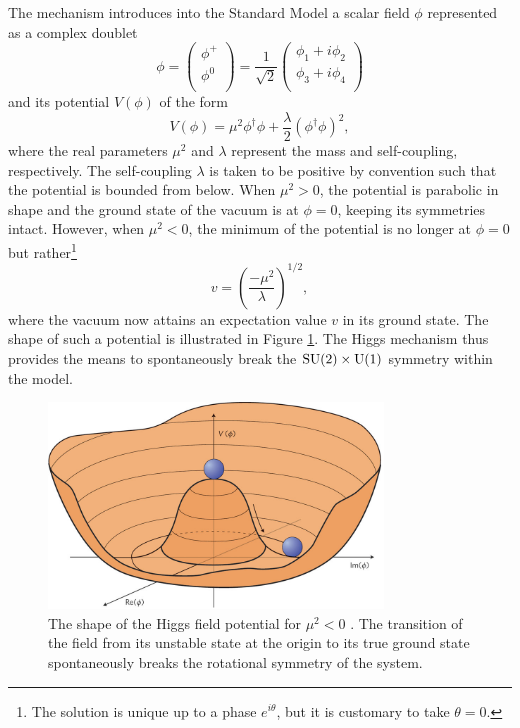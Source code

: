 The mechanism introduces into the Standard Model a scalar field $\phi$ represented as a complex doublet
\begin{equation}
  \phi = \begin{pmatrix}
           \phi^{+} \\
           \phi^{0} \\
         \end{pmatrix}
       = \frac{1}{\sqrt{2}}
         \begin{pmatrix}
           \phi_{1} + i\phi_{2} \\
           \phi_{3} + i\phi_{4} \\
         \end{pmatrix}
\end{equation}
and its potential $V(\phi)$ of the form
\begin{equation}
V(\phi) = \mu^{2}\phi^{\dag}\phi + \frac{\lambda}{2}(\phi^{\dag}\phi)^{2},
\end{equation}
where the real parameters $\mu^{2}$ and $\lambda$ represent the mass and self-coupling, respectively. The self-coupling $\lambda$ is taken to be positive by convention such that the potential is bounded from below. When $\mu^{2} > 0$, the potential is parabolic in shape and the ground state of the vacuum is at $\phi = 0$, keeping its symmetries intact. However, when $\mu^{2} < 0$, the minimum of the potential is no longer at $\phi = 0$ but rather\footnote{The solution is unique up to a phase $e^{i\theta}$, but it is customary to take $\theta = 0$.}
\begin{equation}
  v = \left(\frac{-\mu^{2}}{\lambda}\right)^{1/2},
  \label{eq:vev}
\end{equation}
where the vacuum now attains an expectation value $v$ in its ground state. The shape of such a potential is illustrated in Figure \ref{fig:potential}. The Higgs mechanism thus provides the means to spontaneously break the $\mathrm{SU(2)} \times \mathrm{U(1)}$ symmetry within the model.

\begin{figure}[htbp]
  \centering
    \includegraphics[width=3.5in]{images/higgspotential}
    \caption[Shape of the Higgs Field Potential]{The shape of the Higgs field potential for $\mu^{2} < 0$ \cite{deBoer:2013pud}. The transition of the field from its unstable state at the origin to its true ground state spontaneously breaks the rotational symmetry of the system.}
    \label{fig:potential}
\end{figure}

